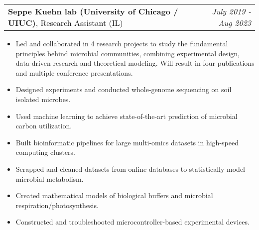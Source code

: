 \documentclass[letterpaper,11pt]{article}
\makeatletter
\newcommand{\resumeItem}[2]{
  \item {#2\vspace{-2pt}} %
}
\newcommand{\resumeSubheading}[4]{
  \vspace{-1pt}\item
    \begin{tabular*}{0.97\textwidth}[t]{l@{\extracolsep{\fill}}r}
      \textbf{#1}, {#2} (#3) & \textit{#4} \\
    \end{tabular*}\vspace{-5pt}
}
\newcommand{\resumeItemListStart}{\begin{itemize}[leftmargin=*]} %
\newcommand{\resumeItemListEnd}{\end{itemize}\vspace{-5pt}}
\makeatother
\begin{document}
  \resumeSubheading
  {Seppe Kuehn lab (University of Chicago / UIUC)}{Research Assistant}
  {IL}{July 2019 - Aug 2023}
    \resumeItemListStart
    \resumeItem{Research:}{Led and collaborated in 4 research projects to study the fundamental principles behind microbial communities, combining experimental design, data-driven research and theoretical modeling. Will result in four publications and multiple conference presentations.}
    \resumeItem{Experimental design:}{Designed experiments and conducted whole-genome sequencing on soil isolated microbes.}
    \resumeItem{Statistical modeling:}{Used machine learning to achieve state-of-the-art prediction of microbial carbon utilization.}
    \resumeItem{Bioinformatics:}{Built bioinformatic pipelines for large multi-omics datasets in high-speed computing clusters.}
    \resumeItem{Data collection:}{Scrapped and cleaned datasets from online databases to statistically model microbial metabolism.}
    \resumeItem{Theoretical modeling:}{Created mathematical models of biological buffers and microbial respiration/photosynthesis.}
    \resumeItem{Hardware:}{Constructed and troubleshooted microcontroller-based experimental devices. }
    
\resumeItemListEnd




\end{document}
